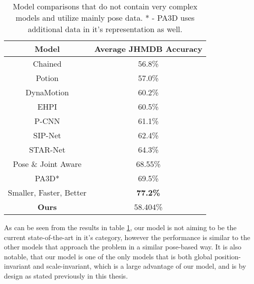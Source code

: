 \begin{table}[ht]
	\centering
	\begin{tabular}{||c c||} 
		\hline
		\textbf{Model} & \textbf{Average JHMDB Accuracy} \\
		\hline\hline
		Chained \cite{Chained} & 56.8\% \\
		Potion \cite{potion} & 57.0\% \\
		DynaMotion \cite{dynamic-motion} & 60.2\% \\
		EHPI \cite{simple_yet_efficient} & 60.5\% \\
		P-CNN \cite{PCNN} & 61.1\% \\
		SIP-Net \cite{sipnet} & 62.4\% \\
		STAR-Net \cite{star-net} & 64.3\% \\
		Pose \& Joint Aware \cite{poseandjointaware} & 68.55\% \\
		PA3D* \cite{PA3D} & 69.5\% \\
		Smaller, Faster, Better \cite{smaller_faster_better} & \textbf{77.2\%} \\
		\hline\hline
		\textbf{Ours} & 58.404\% \\
		\hline
	\end{tabular}
	\caption{Model comparisons that do not contain very complex models and utilize mainly pose data. * - PA3D uses additional data in it's representation as well.}
	\label{tab:model-comparison}
\end{table}

As can be seen from the results in table \ref{tab:model-comparison}, our model is not aiming to be the current state-of-the-art in it's category, however the performance is similar to the other models that approach the problem in a similar pose-based way. It is also notable, that our model is one of the only models that is both global position-invariant and scale-invariant, which is a large advantage of our model, and is by design as stated previously in this thesis.